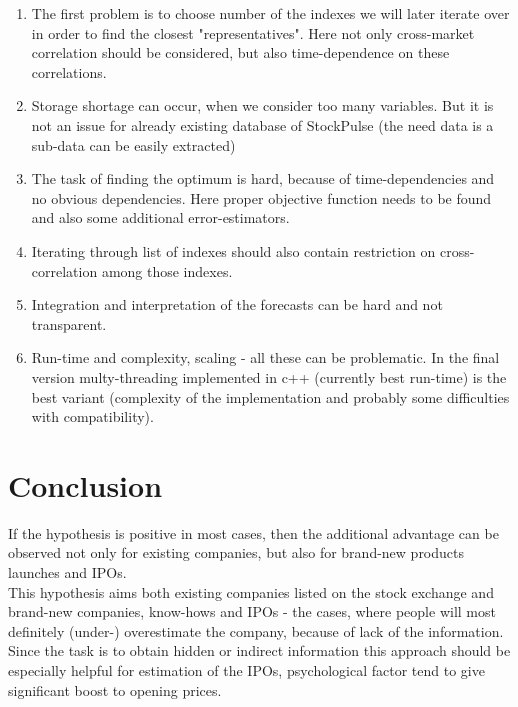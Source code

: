 \documentclass{article}
\begin{document}
\begin{enumerate}
	\item The first problem is to choose number of the indexes we will later iterate over in order to find the closest "representatives". Here not only cross-market correlation should be considered, but also time-dependence on these correlations.
	\item Storage shortage can occur, when we consider too many variables. But it is not an issue for already existing database of StockPulse (the need data is a sub-data can be easily extracted)
	\item The task of finding the optimum is hard, because of time-dependencies and no obvious dependencies. Here proper objective function needs to be found and also some additional error-estimators.
	\item Iterating through list of indexes should also contain restriction on cross-correlation among those indexes.
	\item Integration and interpretation of the forecasts can be hard and not transparent.
	\item Run-time and complexity, scaling - all these can be problematic. In the final version multy-threading implemented in c++ (currently best run-time) is the best variant (complexity of the implementation and probably some difficulties with compatibility).
\end{enumerate}

\newpage
\section {Conclusion}
If the hypothesis is positive in most cases, then the additional advantage can be observed not only for existing companies, but also for brand-new products launches and IPOs.\\
This hypothesis aims both existing companies listed on the stock exchange and brand-new companies, know-hows and IPOs - the cases, where people will most definitely (under-) overestimate the company, because of lack of the information. Since the task is to obtain hidden or indirect information this approach should be especially helpful for estimation of the IPOs, psychological factor tend to give significant boost to opening prices.\\
\end{document}
